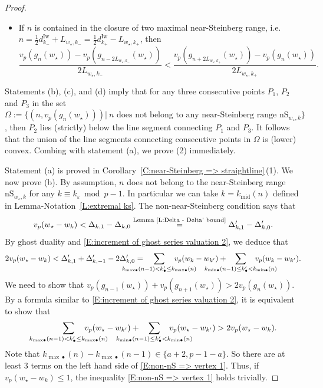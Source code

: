 \documentclass[12pt]{amsart}
\theoremstyle{definition}
\numberwithin{equation}{subsection}
\newcommand{\Iw}{\mathrm{Iw}}
\newcommand{\nS}{\mathrm{nS}}
\newcommand{\midd}{\mathrm{mid}}
\begin{document}
\begin{proof}
\begin{itemize}
\item [(d)] If $n$ is contained in the closure of two maximal near-Steinberg range, i.e. $n = \frac 12 d_{k_-}^\Iw + L_{w_\star, k_-} = \frac 12 d_{k_+}^\Iw - L_{w_\star, k_+}$, then
$$
\frac{v_p(g_n(w_\star)) - v_p(g_{n-2L_{w_\star, k_-}}(w_\star))}{2L_{w_\star, k_-}} < \frac{v_p(g_{n+2L_{w_\star, k_+}}(w_\star))-v_p(g_n(w_\star)) }{2L_{w_\star, k_+}}.
$$
\end{itemize}
Statements (b),  (c), and (d) imply that for any three consecutive points $P_1$, $P_2$ and $P_3$ in the set $\Omega:= \{(n,v_p(g_n(w_\star)))| ~n \text{~does not belong to any near-Steinberg range~} \nS_{w_\star,k} \}$, then $P_2$ lies (strictly) below the line segment connecting $P_1$ and $P_3$. It follows that the union of the line segments connecting consecutive points in $\Omega$ is (lower) convex. Combing with statement (a), we prove (2) immediately. 



Statement (a) is proved in Corollary~\ref{C:near-Steinberg => straightline}\,(1).
We now prove (b). By assumption, $n$ does not belong to the near-Steinberg range $\nS_{w_\star,k}$ for any $k\equiv k_\varepsilon \bmod p-1$. In particular we can take $k=k_{\midd}(n)$ defined in Lemma-Notation~\ref{L:extremal ks}. The non-near-Steinberg condition says that
$$v_p(w_\star - w_k) < \Delta_{k, 1} - \Delta_{k, 0} \stackrel{\textrm{Lemma~\ref{L:Delta - Delta' bound}}}= \Delta'_{k,1}-\Delta'_{k,0}.
$$
By ghost duality and \eqref{E:increment of ghost series valuation 2}, we deduce that
\begin{equation}
\label{E:vp(wbullet - wk)< Delta -Delta explained}
2v_p(w_\star - w_k) < \Delta'_{k, 1} + \Delta'_{k, -1} - 2\Delta'_{k, 0} =\hspace{-30pt}\sum_{
k_{{\max}\bullet}(n-1) < k'_\bullet \leq k_{{\max}\bullet}(n)} 
\hspace{-30pt} v_p(w_k - w_{k'})
+\hspace{-30pt}
\sum_{
k_{{\min}\bullet}(n-1) \leq k'_\bullet < k_{{\min}\bullet}(n)}
\hspace{-30pt}v_p(w_k - w_{k'}).
\end{equation}
We need to show that
$v_p(g_{n-1}(w_\star)) + v_p(g_{n+1}(w_\star)) > 2v_p(g_n(w_\star))$. By a formula similar to \eqref{E:increment of ghost series valuation 2}, it is equivalent to show that
\begin{equation}
\label{E:non-nS => vertex 1}
\sum_{
k_{{\max}\bullet}(n-1) < k'_\bullet \leq k_{{\max}\bullet}(n)} 
\hspace{-30pt} v_p(w_\star - w_{k'})
+\hspace{-30pt}
\sum_{
k_{{\min}\bullet}(n-1) \leq k'_\bullet < k_{{\min}\bullet}(n)}
\hspace{-30pt}v_p(w_\star - w_{k'})
> 
2 v_p(w_\star - w_{k}).
\end{equation}
Note that $k_{{\max}\bullet}(n) - k_{{\max}\bullet}(n-1)\in \{a+2,p-1-a\}$. So there are at least $3$ terms on the left hand side of \eqref{E:non-nS => vertex 1}. Thus, if $v_p(w_\star - w_k)\leq 1$, the inequality \eqref{E:non-nS => vertex 1} holds trivially.


\end{proof}
\end{document}
